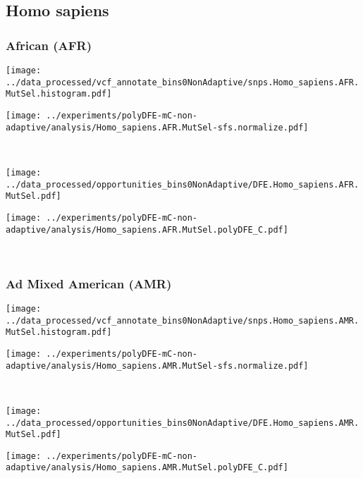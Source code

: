 \subsection{Homo sapiens}

\subsubsection{African (AFR)}

\begin{minipage}{0.49\linewidth}
    \texttt{[image: ../data\_processed/vcf\_annotate\_bins0NonAdaptive/snps.Homo\_sapiens.AFR.MutSel.histogram.pdf]}
\end{minipage}
\begin{minipage}{0.49\linewidth}
    \texttt{[image: ../experiments/polyDFE-mC-non-adaptive/analysis/Homo\_sapiens.AFR.MutSel-sfs.normalize.pdf]}
\end{minipage}
\\
\begin{minipage}{0.49\linewidth}
    \texttt{[image: ../data\_processed/opportunities\_bins0NonAdaptive/DFE.Homo\_sapiens.AFR.MutSel.pdf]}
\end{minipage}
\begin{minipage}{0.49\linewidth}
    \texttt{[image: ../experiments/polyDFE-mC-non-adaptive/analysis/Homo\_sapiens.AFR.MutSel.polyDFE\_C.pdf]}
\end{minipage}
\\

\subsubsection{Ad Mixed American (AMR)}

\begin{minipage}{0.49\linewidth}
    \texttt{[image: ../data\_processed/vcf\_annotate\_bins0NonAdaptive/snps.Homo\_sapiens.AMR.MutSel.histogram.pdf]}
\end{minipage}
\begin{minipage}{0.49\linewidth}
    \texttt{[image: ../experiments/polyDFE-mC-non-adaptive/analysis/Homo\_sapiens.AMR.MutSel-sfs.normalize.pdf]}
\end{minipage}
\\
\begin{minipage}{0.49\linewidth}
    \texttt{[image: ../data\_processed/opportunities\_bins0NonAdaptive/DFE.Homo\_sapiens.AMR.MutSel.pdf]}
\end{minipage}
\begin{minipage}{0.49\linewidth}
    \texttt{[image: ../experiments/polyDFE-mC-non-adaptive/analysis/Homo\_sapiens.AMR.MutSel.polyDFE\_C.pdf]}
\end{minipage}
\\

